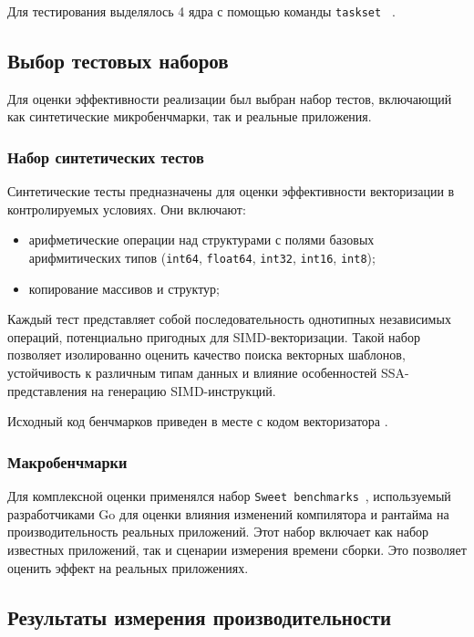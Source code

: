 Для тестирования выделялось 4 ядра с помощью команды \texttt{taskset} ~\cite{taskset}.


\subsection{Выбор тестовых наборов}
\label{sec:benchmarks}

Для оценки эффективности реализации был выбран набор тестов, включающий как синтетические микробенчмарки, 
так и реальные приложения.

\subsubsection{Набор синтетических тестов}

Синтетические тесты предназначены для оценки эффективности векторизации в контролируемых условиях. Они включают:
\begin{itemize}
\item арифметические операции над структурами с полями базовых арифмитических типов 
(\texttt{int64}, \texttt{float64}, \texttt{int32}, \texttt{int16}, \texttt{int8});
\item копирование массивов и структур;
\end{itemize}

Каждый тест представляет собой последовательность однотипных независимых операций, 
потенциально пригодных для SIMD-векторизации. 
Такой набор позволяет изолированно оценить качество поиска векторных шаблонов, 
устойчивость к различным типам данных и влияние особенностей 
SSA-представления на генерацию SIMD-инструкций.

Исходный код бенчмарков приведен в месте с кодом векторизатора \cite{go_cl_783220}.

\subsubsection{Макробенчмарки}

Для комплексной оценки применялся набор \texttt{Sweet benchmarks}~\cite{sweet_bench}, 
используемый разработчиками Go для оценки влияния изменений компилятора и рантайма на производительность реальных приложений.
Этот набор включает как набор известных приложений, так и сценарии измерения времени сборки.
Это позволяет оценить эффект на реальных приложениях.

\subsection{Результаты измерения производительности}
\label{sec:perf_results}

